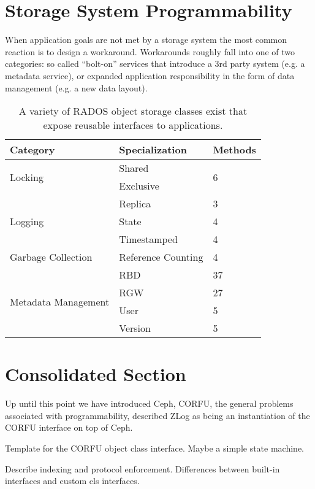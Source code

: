 \documentclass[10pt,twocolumn]{article}
\begin{document}
\section{Storage System Programmability}

When application goals are not met by a storage system the most common reaction
is to design a workaround. Workarounds roughly fall into one of two categories:
so called ``bolt-on'' services that introduce a 3rd party system (e.g. a
metadata service), or expanded application responsibility in the form of data
management (e.g. a new data layout).

\begin{table}
\begin{tabular}{|l|l|l|}
\hline
Category & Specialization & Methods \\ \hline
\multirow{2}{*}{Locking} & Shared & \multirow{2}{*}{6} \\
                         & Exclusive & \\ \hline
\multirow{3}{*}{Logging} & Replica & 3 \\
                         & State & 4 \\
                         & Timestamped & 4 \\ \hline
Garbage Collection & Reference Counting & 4 \\ \hline
\multirow{4}{*}{Metadata Management} & RBD & 37 \\
 & RGW & 27 \\
 & User & 5 \\
 & Version & 5 \\ \hline
\end{tabular}
\caption{A variety of RADOS object storage classes exist that expose reusable interfaces to applications.}
\label{tab:objclasses}
\end{table}

\section{Consolidated Section}

Up until this point we have introduced Ceph, CORFU, the general problems
associated with programmability, described ZLog as being an instantiation of
the CORFU interface on top of Ceph.

Template for the CORFU object class interface. Maybe a simple state machine.

Describe indexing and protocol enforcement.
Differences between built-in interfaces and custom cls interfaces.
\end{document}
